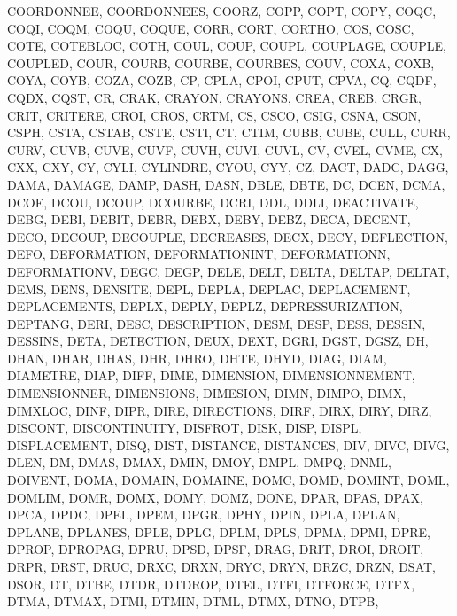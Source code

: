 {{{		COORDONNEE,
		COORDONNEES,
		COORZ,
		COPP,
		COPT,
		COPY,
		COQC,
		COQI,
		COQM,
		COQU,
		COQUE,
		CORR,
		CORT,
		CORTHO,
		COS,
		COSC,
		COTE,
		COTEBLOC,
		COTH,
		COUL,
		COUP,
		COUPL,
		COUPLAGE,
		COUPLE,
		COUPLED,
		COUR,
		COURB,
		COURBE,
		COURBES,
		COUV,
		COXA,
		COXB,
		COYA,
		COYB,
		COZA,
		COZB,
		CP,
		CPLA,
		CPOI,
		CPUT,
		CPVA,
		CQ,
		CQDF,
		CQDX,
		CQST,
		CR,
		CRAK,
		CRAYON,
		CRAYONS,
		CREA,
		CREB,
		CRGR,
		CRIT,
		CRITERE,
		CROI,
		CROS,
		CRTM,
		CS,
		CSCO,
		CSIG,
		CSNA,
		CSON,
		CSPH,
		CSTA,
		CSTAB,
		CSTE,
		CSTI,
		CT,
		CTIM,
		CUBB,
		CUBE,
		CULL,
		CURR,
		CURV,
		CUVB,
		CUVE,
		CUVF,
		CUVH,
		CUVI,
		CUVL,
		CV,
		CVEL,
		CVME,
		CX,
		CXX,
		CXY,
		CY,
		CYLI,
		CYLINDRE,
		CYOU,
		CYY,
		CZ,
		DACT,
		DADC,
		DAGG,
		DAMA,
		DAMAGE,
		DAMP,
		DASH,
		DASN,
		DBLE,
		DBTE,
		DC,
		DCEN,
		DCMA,
		DCOE,
		DCOU,
		DCOUP,
		DCOURBE,
		DCRI,
		DDL,
		DDLI,
		DEACTIVATE,
		DEBG,
		DEBI,
		DEBIT,
		DEBR,
		DEBX,
		DEBY,
		DEBZ,
		DECA,
		DECENT,
		DECO,
		DECOUP,
		DECOUPLE,
		DECREASES,
		DECX,
		DECY,
		DEFLECTION,
		DEFO,
		DEFORMATION,
		DEFORMATIONINT,
		DEFORMATIONN,
		DEFORMATIONV,
		DEGC,
		DEGP,
		DELE,
		DELT,
		DELTA,
		DELTAP,
		DELTAT,
		DEMS,
		DENS,
		DENSITE,
		DEPL,
		DEPLA,
		DEPLAC,
		DEPLACEMENT,
		DEPLACEMENTS,
		DEPLX,
		DEPLY,
		DEPLZ,
		DEPRESSURIZATION,
		DEPTANG,
		DERI,
		DESC,
		DESCRIPTION,
		DESM,
		DESP,
		DESS,
		DESSIN,
		DESSINS,
		DETA,
		DETECTION,
		DEUX,
		DEXT,
		DGRI,
		DGST,
		DGSZ,
		DH,
		DHAN,
		DHAR,
		DHAS,
		DHR,
		DHRO,
		DHTE,
		DHYD,
		DIAG,
		DIAM,
		DIAMETRE,
		DIAP,
		DIFF,
		DIME,
		DIMENSION,
		DIMENSIONNEMENT,
		DIMENSIONNER,
		DIMENSIONS,
		DIMESION,
		DIMN,
		DIMPO,
		DIMX,
		DIMXLOC,
		DINF,
		DIPR,
		DIRE,
		DIRECTIONS,
		DIRF,
		DIRX,
		DIRY,
		DIRZ,
		DISCONT,
		DISCONTINUITY,
		DISFROT,
		DISK,
		DISP,
		DISPL,
		DISPLACEMENT,
		DISQ,
		DIST,
		DISTANCE,
		DISTANCES,
		DIV,
		DIVC,
		DIVG,
		DLEN,
		DM,
		DMAS,
		DMAX,
		DMIN,
		DMOY,
		DMPL,
		DMPQ,
		DNML,
		DOIVENT,
		DOMA,
		DOMAIN,
		DOMAINE,
		DOMC,
		DOMD,
		DOMINT,
		DOML,
		DOMLIM,
		DOMR,
		DOMX,
		DOMY,
		DOMZ,
		DONE,
		DPAR,
		DPAS,
		DPAX,
		DPCA,
		DPDC,
		DPEL,
		DPEM,
		DPGR,
		DPHY,
		DPIN,
		DPLA,
		DPLAN,
		DPLANE,
		DPLANES,
		DPLE,
		DPLG,
		DPLM,
		DPLS,
		DPMA,
		DPMI,
		DPRE,
		DPROP,
		DPROPAG,
		DPRU,
		DPSD,
		DPSF,
		DRAG,
		DRIT,
		DROI,
		DROIT,
		DRPR,
		DRST,
		DRUC,
		DRXC,
		DRXN,
		DRYC,
		DRYN,
		DRZC,
		DRZN,
		DSAT,
		DSOR,
		DT,
		DTBE,
		DTDR,
		DTDROP,
		DTEL,
		DTFI,
		DTFORCE,
		DTFX,
		DTMA,
		DTMAX,
		DTMI,
		DTMIN,
		DTML,
		DTMX,
		DTNO,
		DTPB,
}}}

